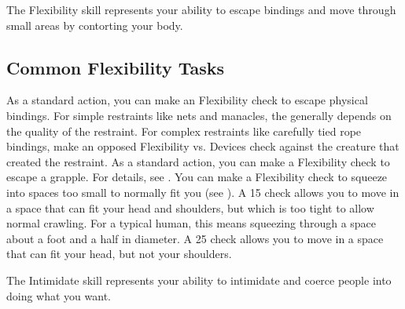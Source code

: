 
\newpage
{}
    The Flexibility skill represents your ability to escape bindings and move through small areas by contorting your body.

    \subsection{Common Flexibility Tasks}

         As a standard action, you can make an Flexibility check to escape physical bindings.
        For simple restraints like nets and manacles, the  generally depends on the quality of the restraint.
        For complex restraints like carefully tied rope bindings, make an opposed Flexibility vs. Devices check against the creature that created the restraint.
         As a standard action, you can make a Flexibility check to escape a grapple.
        For details, see .
         You can make a Flexibility check to squeeze into spaces too small to normally fit you (see ).
        A  15 check allows you to move in a space that can fit your head and shoulders, but which is too tight to allow normal crawling.
        For a typical human, this means squeezing through a space about a foot and a half in diameter.
        A  25 check allows you to move in a space that can fit your head, but not your shoulders.

\newpage
{}
    The Intimidate skill represents your ability to intimidate and coerce people into doing what you want.

